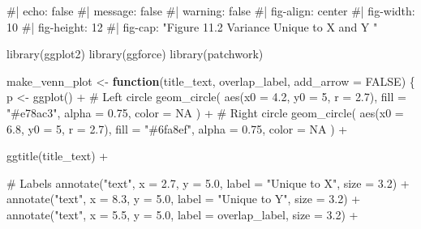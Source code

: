\documentclass[
  letterpaper,
  DIV=11,
  numbers=noendperiod]{scrreprt}
\newenvironment{Shaded}{\begin{snugshade}}{\end{snugshade}}
\newcommand{\AttributeTok}[1]{\textcolor[rgb]{0.40,0.45,0.13}{#1}}
\newcommand{\CommentTok}[1]{\textcolor[rgb]{0.37,0.37,0.37}{#1}}
\newcommand{\ConstantTok}[1]{\textcolor[rgb]{0.56,0.35,0.01}{#1}}
\newcommand{\ControlFlowTok}[1]{\textcolor[rgb]{0.00,0.23,0.31}{\textbf{#1}}}
\newcommand{\DecValTok}[1]{\textcolor[rgb]{0.68,0.00,0.00}{#1}}
\newcommand{\FloatTok}[1]{\textcolor[rgb]{0.68,0.00,0.00}{#1}}
\newcommand{\FunctionTok}[1]{\textcolor[rgb]{0.28,0.35,0.67}{#1}}
\newcommand{\NormalTok}[1]{\textcolor[rgb]{0.00,0.23,0.31}{#1}}
\newcommand{\OtherTok}[1]{\textcolor[rgb]{0.00,0.23,0.31}{#1}}
\newcommand{\SpecialCharTok}[1]{\textcolor[rgb]{0.37,0.37,0.37}{#1}}
\newcommand{\StringTok}[1]{\textcolor[rgb]{0.13,0.47,0.30}{#1}}
\begin{document}
\begin{Shaded}
\begin{Highlighting}[]
\CommentTok{\#| echo: false}
\CommentTok{\#| message: false}
\CommentTok{\#| warning: false}
\CommentTok{\#| fig{-}align: center}
\CommentTok{\#| fig{-}width: 10}
\CommentTok{\#| fig{-}height: 12}
\CommentTok{\#| fig{-}cap: "Figure 11.2 Variance Unique to X and Y "}
\end{Highlighting}
\end{Shaded}

\begin{Shaded}
\begin{Highlighting}[]
\FunctionTok{library}\NormalTok{(ggplot2)}
\FunctionTok{library}\NormalTok{(ggforce)}
\FunctionTok{library}\NormalTok{(patchwork)}

\NormalTok{make\_venn\_plot }\OtherTok{\textless{}{-}} \ControlFlowTok{function}\NormalTok{(title\_text, overlap\_label, }\AttributeTok{add\_arrow =} \ConstantTok{FALSE}\NormalTok{) \{}
\NormalTok{  p }\OtherTok{\textless{}{-}} \FunctionTok{ggplot}\NormalTok{() }\SpecialCharTok{+}
    \CommentTok{\# Left circle}
    \FunctionTok{geom\_circle}\NormalTok{(}
      \FunctionTok{aes}\NormalTok{(}\AttributeTok{x0 =} \FloatTok{4.2}\NormalTok{, }\AttributeTok{y0 =} \DecValTok{5}\NormalTok{, }\AttributeTok{r =} \FloatTok{2.7}\NormalTok{),}
      \AttributeTok{fill =} \StringTok{"\#e78ac3"}\NormalTok{, }\AttributeTok{alpha =} \FloatTok{0.75}\NormalTok{, }\AttributeTok{color =} \ConstantTok{NA}
\NormalTok{    ) }\SpecialCharTok{+}
    \CommentTok{\# Right circle}
    \FunctionTok{geom\_circle}\NormalTok{(}
      \FunctionTok{aes}\NormalTok{(}\AttributeTok{x0 =} \FloatTok{6.8}\NormalTok{, }\AttributeTok{y0 =} \DecValTok{5}\NormalTok{, }\AttributeTok{r =} \FloatTok{2.7}\NormalTok{),}
      \AttributeTok{fill =} \StringTok{"\#6fa8ef"}\NormalTok{, }\AttributeTok{alpha =} \FloatTok{0.75}\NormalTok{, }\AttributeTok{color =} \ConstantTok{NA}
\NormalTok{    ) }\SpecialCharTok{+}
    
    \FunctionTok{ggtitle}\NormalTok{(title\_text) }\SpecialCharTok{+}
    
    \CommentTok{\# Labels}
    \FunctionTok{annotate}\NormalTok{(}\StringTok{"text"}\NormalTok{, }\AttributeTok{x =} \FloatTok{2.7}\NormalTok{, }\AttributeTok{y =} \FloatTok{5.0}\NormalTok{, }\AttributeTok{label =} \StringTok{"Unique to X"}\NormalTok{, }\AttributeTok{size =} \FloatTok{3.2}\NormalTok{) }\SpecialCharTok{+}
    \FunctionTok{annotate}\NormalTok{(}\StringTok{"text"}\NormalTok{, }\AttributeTok{x =} \FloatTok{8.3}\NormalTok{, }\AttributeTok{y =} \FloatTok{5.0}\NormalTok{, }\AttributeTok{label =} \StringTok{"Unique to Y"}\NormalTok{, }\AttributeTok{size =} \FloatTok{3.2}\NormalTok{) }\SpecialCharTok{+}
    \FunctionTok{annotate}\NormalTok{(}\StringTok{"text"}\NormalTok{, }\AttributeTok{x =} \FloatTok{5.5}\NormalTok{, }\AttributeTok{y =} \FloatTok{5.0}\NormalTok{, }\AttributeTok{label =}\NormalTok{ overlap\_label, }\AttributeTok{size =} \FloatTok{3.2}\NormalTok{) }\SpecialCharTok{+}
    

\end{Highlighting}
\end{Shaded}
\end{document}
